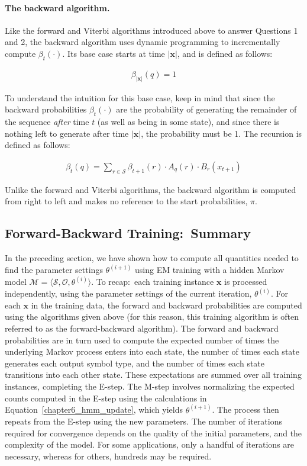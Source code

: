 \paragraph{\textbf{The backward algorithm.}}
Like the forward and Viterbi algorithms introduced above to answer
Questions 1 and 2, the backward algorithm uses dynamic programming to
incrementally compute $\beta_t(\cdot)$.  Its base case starts at time
$|\textbf{x}|$, and is defined as follows:

\label{chapter6_backward}

\begin{eqnarray*}
\beta_{|\textbf{x}|}(q) = 1
\end{eqnarray*}

\noindent To understand the intuition for this base case, keep in mind
that since the backward probabilities $\beta_t(\cdot)$ are the
probability of generating the remainder of the sequence \emph{after}
time $t$ (as well as being in some state), and since there is nothing
left to generate after time $|\textbf{x}|$, the probability must be 1.
The recursion is defined as follows:

\begin{eqnarray*}
\beta_{t}(q) = \sum_{r \in \mathcal{S}} \beta_{t+1}(r) \cdot A_q(r) \cdot B_r(x_{t+1})
\end{eqnarray*}

\noindent Unlike the forward and Viterbi algorithms, the backward
algorithm is computed from right to left and makes no reference to the
start probabilities, $\pi$.

\subsection{Forward-Backward Training:\ Summary} 

In the preceding section, we have shown how to compute all quantities
needed to find the parameter settings $\theta^{(i+1)}$ using EM
training with a hidden Markov model $\mathcal{M}=\langle
\mathcal{S},\mathcal{O}, \theta^{(i)} \rangle$.  To recap:\ each
training instance $\textbf{x}$ is processed independently, using the
parameter settings of the current iteration, $\theta^{(i)}$. For each
$\textbf{x}$ in the training data, the forward and backward
probabilities are computed using the algorithms given above (for this
reason, this training algorithm is often referred to as the
forward-backward algorithm).  The forward and backward probabilities
are in turn used to compute the expected number of times the
underlying Markov process enters into each state, the number of times
each state generates each output symbol type, and the number of times
each state transitions into each other state.  These expectations are
summed over all training instances, completing the E-step.  The M-step
involves normalizing the expected counts computed in the E-step using
the calculations in Equation~\ref{chapter6_hmm_update}, which yields
$\theta^{(i+1)}$.  The process then repeats from the E-step using the
new parameters.  The number of iterations required for convergence
depends on the quality of the initial parameters, and the complexity
of the model.  For some applications, only a handful of iterations are
necessary, whereas for others, hundreds may be required.

